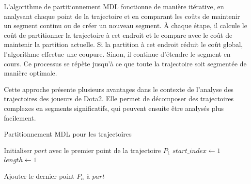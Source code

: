 \documentclass{article}
\begin{document}
        L'algorithme de partitionnement MDL fonctionne de manière itérative, en analysant chaque point de la trajectoire et en comparant les coûts de maintenir un segment continu ou de créer un nouveau segment. À chaque étape, il calcule le coût de partitionner la trajectoire à cet endroit et le compare avec le coût de maintenir la partition actuelle. Si la partition à cet endroit réduit le coût global, l'algorithme effectue une coupure. Sinon, il continue d'étendre le segment en cours. Ce processus se répète jusqu'à ce que toute la trajectoire soit segmentée de manière optimale.
        
        Cette approche présente plusieurs avantages dans le contexte de l'analyse des trajectoires des joueurs de Dota2. Elle permet de décomposer des trajectoires complexes en segments significatifs, qui peuvent ensuite être analysés plus facilement.

        \begin{algorithm}[H]
        \caption{Partitionnement MDL pour les trajectoires}
        
        Initialiser $part$ avec le premier point de la trajectoire $P_1$ \;
        $start\_index \gets 1$ \;
        $length \gets 1$ \;
        
        
        Ajouter le dernier point $P_n$ à $part$ \;
         
        \end{algorithm}
\end{document}
